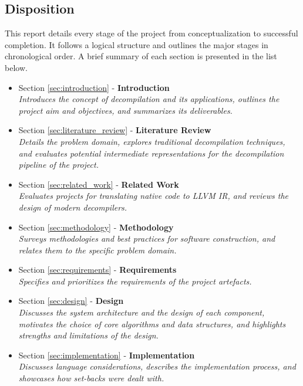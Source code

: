 
\subsection{Disposition}

This report details every stage of the project from conceptualization to successful completion. It follows a logical structure and outlines the major stages in chronological order. A brief summary of each section is presented in the list below.

\begin{itemize}
	\item Section \ref{sec:introduction} - \textbf{Introduction} \\ \textit{Introduces the concept of decompilation and its applications, outlines the project aim and objectives, and summarizes its deliverables.}
	\item Section \ref{sec:literature_review} - \textbf{Literature Review} \\ \textit{Details the problem domain, explores traditional decompilation techniques, and evaluates potential intermediate representations for the decompilation pipeline of the project.}
	\item Section \ref{sec:related_work} - \textbf{Related Work} \\ \textit{Evaluates projects for translating native code to LLVM IR, and reviews the design of modern decompilers.}
	\item Section \ref{sec:methodology} - \textbf{Methodology} \\ \textit{Surveys methodologies and best practices for software construction, and relates them to the specific problem domain.}
	\item Section \ref{sec:requirements} - \textbf{Requirements} \\ \textit{Specifies and prioritizes the requirements of the project artefacts.}
	\item Section \ref{sec:design} - \textbf{Design} \\ \textit{Discusses the system architecture and the design of each component, motivates the choice of core algorithms and data structures, and highlights strengths and limitations of the design.}
	\item Section \ref{sec:implementation} - \textbf{Implementation} \\ \textit{Discusses language considerations, describes the implementation process, and showcases how set-backs were dealt with.}

\end{itemize}
